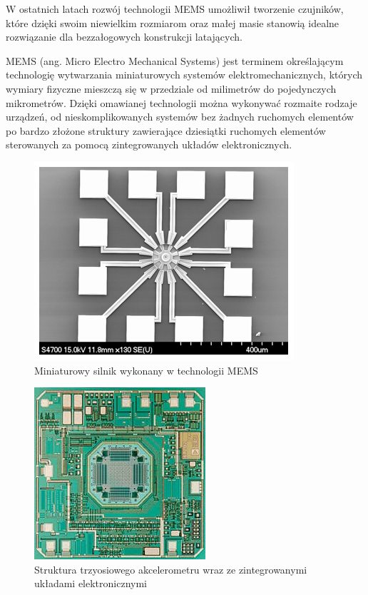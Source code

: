 W ostatnich latach rozwój technologii MEMS umożliwił tworzenie czujników, które dzięki swoim niewielkim rozmiarom oraz małej masie stanowią idealne rozwiązanie dla bezzałogowych konstrukcji latających. 

MEMS (ang. Micro Electro Mechanical Systems) jest terminem określającym technologię wytwarzania miniaturowych systemów elektromechanicznych, których wymiary fizyczne mieszczą się w przedziale od milimetrów do pojedynczych mikrometrów. Dzięki omawianej technologii można wykonywać rozmaite rodzaje urządzeń, od nieskomplikowanych systemów bez żadnych ruchomych elementów po bardzo złożone struktury zawierające dziesiątki ruchomych elementów sterowanych za pomocą zintegrowanych układów elektronicznych. 

\begin{figure}[H]
	\centering
	\includegraphics[scale=0.7]{Pictures/microactuator.png}
		\caption[Miniaturowy silnik wykonany w technologii MEMS]{Miniaturowy silnik wykonany w technologii MEMS}
	\label{fig:microactuator}
\end{figure}

\begin{figure}[H]
	\centering
	\includegraphics[scale=0.7]{Pictures/3d_accel.jpg}
		\caption[Struktura trzyosiowego akcelerometru wraz ze zintegrowanymi układami elektronicznymi]{Struktura trzyosiowego akcelerometru wraz ze zintegrowanymi układami elektronicznymi}
	\label{fig:3d_accelerometer}
\end{figure}

